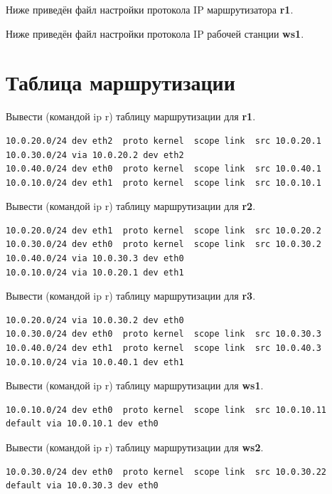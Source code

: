 \documentclass[a4paper,12pt]{article}
\begin{document}
Ниже приведён файл настройки протокола IP маршрутизатора \textbf{r1}.



Ниже приведён файл настройки протокола IP рабочей станции \textbf{ws1}.





\section{Таблица маршрутизации}

Вывести (командой ip r) таблицу маршрутизации для \textbf{r1}.

\begin{Verbatim}
10.0.20.0/24 dev eth2  proto kernel  scope link  src 10.0.20.1 
10.0.30.0/24 via 10.0.20.2 dev eth2 
10.0.40.0/24 dev eth0  proto kernel  scope link  src 10.0.40.1 
10.0.10.0/24 dev eth1  proto kernel  scope link  src 10.0.10.1 
\end{Verbatim}

Вывести (командой ip r) таблицу маршрутизации для \textbf{r2}.

\begin{Verbatim}
10.0.20.0/24 dev eth1  proto kernel  scope link  src 10.0.20.2 
10.0.30.0/24 dev eth0  proto kernel  scope link  src 10.0.30.2 
10.0.40.0/24 via 10.0.30.3 dev eth0 
10.0.10.0/24 via 10.0.20.1 dev eth1 

\end{Verbatim}
Вывести (командой ip r) таблицу маршрутизации для \textbf{r3}.
\begin{Verbatim}
10.0.20.0/24 via 10.0.30.2 dev eth0 
10.0.30.0/24 dev eth0  proto kernel  scope link  src 10.0.30.3 
10.0.40.0/24 dev eth1  proto kernel  scope link  src 10.0.40.3 
10.0.10.0/24 via 10.0.40.1 dev eth1 
\end{Verbatim}

Вывести (командой ip r) таблицу маршрутизации для \textbf{ws1}.
\begin{Verbatim}
10.0.10.0/24 dev eth0  proto kernel  scope link  src 10.0.10.11 
default via 10.0.10.1 dev eth0 
\end{Verbatim}

Вывести (командой ip r) таблицу маршрутизации для \textbf{ws2}.
\begin{Verbatim}
10.0.30.0/24 dev eth0  proto kernel  scope link  src 10.0.30.22 
default via 10.0.30.3 dev eth0 
\end{Verbatim}
\end{document}

